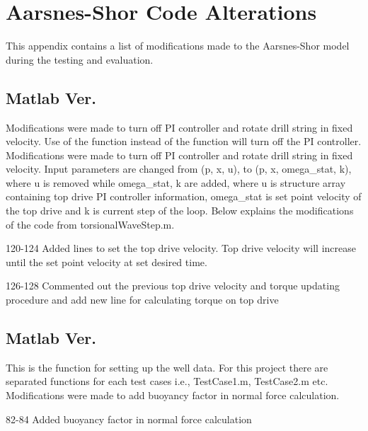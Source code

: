 \chapter{Aarsnes-Shor Code Alterations}
This appendix contains a list of modifications made to the Aarsnes-Shor model during the testing and evaluation.

\section{Matlab Ver.\ }
Modifications were made to turn off PI controller and rotate drill string in fixed velocity. Use of the function  instead of the function  will turn off the PI controller. Modifications were made to turn off PI controller and rotate drill string in fixed velocity. Input parameters are changed from (p, x, u), to (p, x, omega\_stat, k), where u is removed while omega\_stat, k are added, where u is structure array containing top drive PI controller information, omega\_stat is set point velocity of the top drive and k is current step of the loop. Below explains the modifications of the code from torsionalWaveStep.m.

\begin{codemodifications}
\begin{codemodification}{120-124}
Added lines to set the top drive velocity. Top drive velocity will increase until the set point velocity at set desired time.
\end{codemodification}

\begin{codemodification}{126-128}
Commented out the previous top drive velocity and torque updating procedure and add new line for calculating torque on top drive
\end{codemodification}
\end{codemodifications}

\section{Matlab Ver.\ }
This is the function for setting up the well data. For this project there are separated functions for each test cases i.e., TestCase1.m, TestCase2.m etc. Modifications were made to add buoyancy factor in normal force calculation.
\begin{codemodifications}
\begin{codemodification}{82-84}
Added buoyancy factor in normal force calculation
\end{codemodification}
\end{codemodifications}


